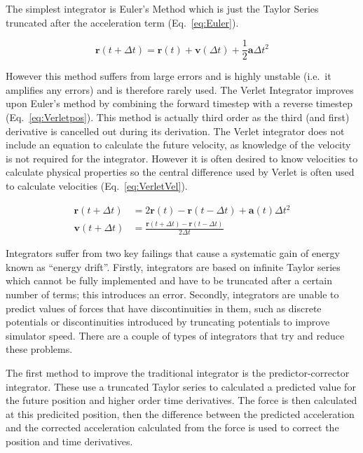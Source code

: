 \documentclass[12pt]{UoAthesis}
\begin{document}
The simplest integrator is Euler's Method which is just the Taylor
Series truncated after the acceleration term (Eq.~\ref{eq:Euler}).

\begin{equation} 
  \mathbf{r}(t+\Delta t) = \mathbf{r}(t) + \mathbf{v}(\Delta t) +
  \frac{1}{2}\mathbf{a}\Delta t^2 
  \label{eq:Euler}
\end{equation}

However this method suffers from large errors and is highly unstable
(i.e.\ it amplifies any errors) \cite{Haile1997} and is therefore
rarely used. The Verlet Integrator \cite{Verlet1967} improves upon
Euler's method by combining the forward timestep with a reverse
timestep (Eq.~\eqref{eq:Verletpos}). This method is actually third
order as the third (and first) derivative is cancelled out during its
derivation. The Verlet integrator does not include an equation to
calculate the future velocity, as knowledge of the velocity is not
required for the integrator.  However it is often desired to know
velocities to calculate physical properties so the central difference
used by Verlet is often used to calculate velocities
(Eq.~\eqref{eq:VerletVel}).

\begin{subequations} 
  \begin{align} 
    \mathbf{r}(t + \Delta t) &= 2\mathbf{r}(t) - \mathbf{r}(t - \Delta t) 
    + \mathbf{a}(t)\Delta t^2
    \label{eq:Verletpos} \\
    \mathbf{v}(t+\Delta t) &= \frac{\mathbf{r}(t+\Delta t) -
      \mathbf{r}(t-\Delta t)}{2\Delta t} 
    \label{eq:VerletVel} 
  \end{align}
\end{subequations}

Integrators suffer from two key failings that cause a systematic gain
of energy known as ``energy drift''. Firstly, integrators are based on
infinite Taylor series which cannot be fully implemented and have
to be truncated after a certain number of terms; this introduces an
error. Secondly, integrators are unable to predict values of forces
that have discontinuities in them, such as discrete potentials or
discontinuities introduced by truncating potentials to improve
simulator speed.  There are a couple of types of integrators that try
and reduce these problems.

The first method to improve the traditional integrator is the
predictor-corrector integrator. These use a truncated Taylor series
to calculated a predicted value for the future position and higher
order time derivatives. The force is then calculated at this
predicited position, then the difference between the predicted
acceleration and the corrected acceleration calculated from the force
is used to correct the position and time derivatives.
\end{document}
